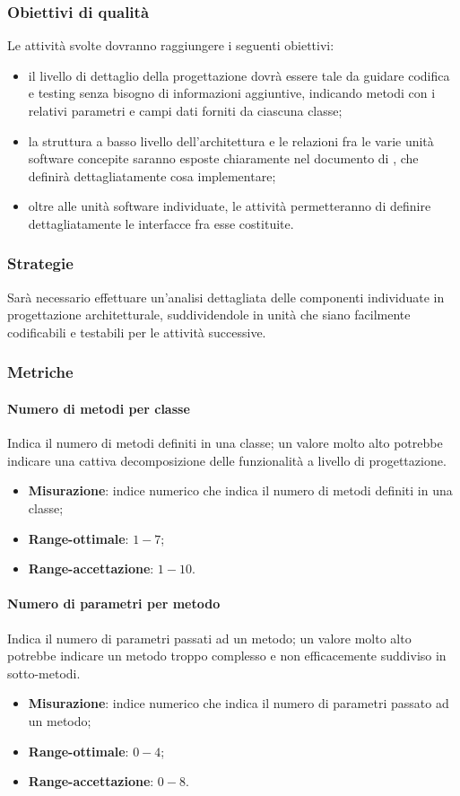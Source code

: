 \subsubsection{Obiettivi di qualità}
Le attività svolte dovranno raggiungere i seguenti obiettivi:
\begin{itemize}
\item il livello di dettaglio della progettazione dovrà essere tale da guidare codifica e testing senza bisogno di informazioni aggiuntive, indicando metodi con i relativi parametri e campi dati forniti da ciascuna classe;
\item la struttura a basso livello dell'architettura e le relazioni fra le varie unità software concepite saranno esposte chiaramente nel documento di \textit{\DDP}, che definirà dettagliatamente cosa implementare;
\item oltre alle unità software individuate, le attività permetteranno di definire dettagliatamente le interfacce fra esse costituite.
\end{itemize}
\subsubsection{Strategie}
Sarà necessario effettuare un'analisi dettagliata delle componenti individuate in progettazione architetturale, suddividendole in unità che siano facilmente codificabili e testabili per le attività successive.
\subsubsection{Metriche}
\paragraph{Numero di metodi per classe}
Indica il numero di metodi definiti in una classe; un valore molto alto potrebbe indicare una cattiva decomposizione delle funzionalità a livello di progettazione.
\begin{itemize}
\item \textbf{Misurazione}: indice numerico che indica il numero di metodi definiti in una classe;
\item \textbf{Range-ottimale}: $1 - 7$;
\item \textbf{Range-accettazione}: $1 - 10$.
\end{itemize}
\paragraph{Numero di parametri per metodo}
Indica il numero di parametri passati ad un metodo; un valore molto alto potrebbe indicare un metodo troppo complesso e non efficacemente suddiviso in sotto-metodi.
\begin{itemize}
\item \textbf{Misurazione}: indice numerico che indica il numero di parametri passato ad un metodo;
\item \textbf{Range-ottimale}: $0 - 4$;
\item \textbf{Range-accettazione}: $0 - 8$.
\end{itemize}

